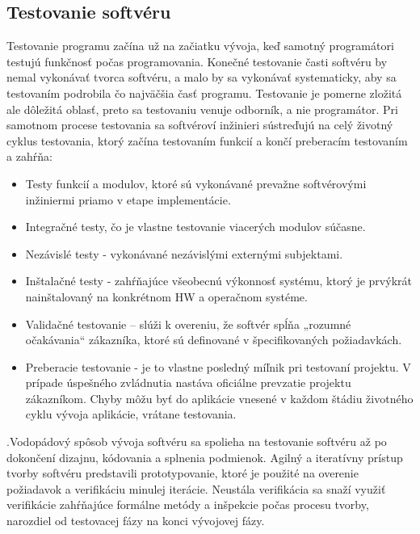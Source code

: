 \documentclass[10pt,twoside,slovak,a4paper]{article}
\begin{document}
\subsection{Testovanie softvéru} \label{testovanie}
\cite{swemb}
Testovanie programu začína už na začiatku vývoja, keď samotný programátori testujú funkčnosť počas programovania. Konečné testovanie časti softvéru by nemal vykonávať tvorca softvéru, a malo by sa vykonávať systematicky, aby sa testovaním podrobila čo najväčšia časť programu. Testovanie je pomerne zložitá ale dôležitá oblasť, preto sa testovaniu venuje odborník, a nie programátor.\cite{CSEroadmap}
Pri samotnom procese testovania sa softvéroví inžinieri sústreďujú na celý životný cyklus testovania, ktorý začína testovaním funkcií a končí preberacím testovaním a zahŕňa:
\begin{itemize}
	\item Testy funkcií a modulov, ktoré sú vykonávané prevažne softvérovými inžiniermi priamo v etape implementácie.
	\item Integračné testy, čo je vlastne testovanie viacerých modulov súčasne.
			  \item Nezávislé testy - vykonávané nezávislými externými subjektami.
    \item Inštalačné testy - zahŕňajúce všeobecnú výkonnosť systému, ktorý je prvýkrát nainštalovaný na konkrétnom HW a operačnom systéme.
    \item Validačné testovanie – slúži k overeniu, že softvér spĺňa „rozumné očakávania“ zákazníka, ktoré sú definované v špecifikovaných požiadavkách.
    \item Preberacie testovanie - je to vlastne posledný míľnik pri testovaní projektu. V prípade úspešného zvládnutia nastáva oficiálne prevzatie projektu zákazníkom. Chyby môžu byť do aplikácie vnesené v každom štádiu životného cyklu vývoja aplikácie, vrátane testovania.
\end{itemize}
\cite{testovanie}
.Vodopádový spôsob vývoja softvéru sa spolieha na testovanie softvéru až po dokončení dizajnu, kódovania a splnenia podmienok. Agilný a iteratívny prístup tvorby softvéru predstavili prototypovanie, ktoré je použité na overenie požiadavok a verifikáciu minulej iterácie. Neustála verifikácia sa snaží využiť verifikácie zahŕňajúce formálne metódy a inšpekcie počas procesu tvorby, narozdiel od testovacej fázy na konci vývojovej fázy.\cite{CSEroadmap}
\end{document}
